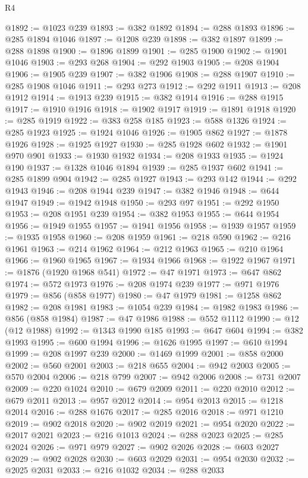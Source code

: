 \begin{lexlean}{R4}
\begin{coremodule}
@1892 := @1023 @239
@1893 := @382 @1892
@1894 := @288 @1893
@1896 := @285 @1894 @1046
@1897 := @1208 @239
@1898 := @382 @1897
@1899 := @288 @1898
@1900 := @1896 @1899
@1901 := @285 @1900
@1902 := @1901 @1046
@1903 := @293 @268
@1904 := @292 @1903
@1905 := @208 @1904
@1906 := @1905 @239
@1907 := @382 @1906
@1908 := @288 @1907
@1910 := @285 @1908 @1046
@1911 := @293 @273
@1912 := @292 @1911
@1913 := @208 @1912
@1914 := @1913 @239
@1915 := @382 @1914
@1916 := @288 @1915
@1917 := @1910 @1916
@1918 := @1902 @1917
@1919 := @1891 @1918
@1920 := @285 @1919
@1922 := @383 @258 @185
@1923 := @588 @1326
@1924 := @285 @1923
@1925 := @1924 @1046
@1926 := @1905 @862
@1927 := @1878 @1926
@1928 := @1925 @1927
@1930 := @285 @1928 @602
@1932 := @1901 @970 @901
@1933 := @1930 @1932
@1934 := @208 @1933
@1935 := @1924 @190
@1937 := @1328 @1046 @1894
@1939 := @285 @1937 @602
@1941 := @285 @1899 @904
@1942 := @285 @1927
@1943 := @293 @142
@1944 := @292 @1943
@1946 := @208 @1944 @239
@1947 := @382 @1946
@1948 := @644 @1947
@1949 := @1942 @1948
@1950 := @293 @97
@1951 := @292 @1950
@1953 := @208 @1951 @239
@1954 := @382 @1953
@1955 := @644 @1954
@1956 := @1949 @1955
@1957 := @1941 @1956
@1958 := @1939 @1957
@1959 := @1935 @1958
@1960 := @208 @1959
@1961 := @218 @590
@1962 := @216 @1961
@1963 := @214 @1962
@1964 := @212 @1963
@1965 := @210 @1964
@1966 := @1960 @1965
@1967 := @1934 @1966
@1968 := @1922 @1967
@1971 := @1876 (@1920 @1968 @541)
@1972 := @47 @1971
@1973 := @647 @862
@1974 := @572 @1973
@1976 := @208 @1974 @239
@1977 := @971 @1976
@1979 := @856 (@858 @1977)
@1980 := @47 @1979
@1981 := @1258 @862
@1982 := @208 @1981
@1983 := @1054 @239
@1984 := @1982 @1983
@1986 := @856 (@858 @1984)
@1987 := @47 @1986
@1988 := @552 @1112
@1990 := @12 (@12 @1988)
@1992 := @1343 @1990 @185
@1993 := @647 @604
@1994 := @382 @1993
@1995 := @600 @1994
@1996 := @1626 @1995
@1997 := @610 @1994
@1999 := @208 @1997 @239
@2000 := @1469 @1999
@2001 := @858 @2000
@2002 := @560 @2001
@2003 := @218 @655
@2004 := @942 @2003
@2005 := @570 @2004
@2006 := @218 @799
@2007 := @942 @2006
@2008 := @731 @2007
@2009 := @220 @1024
@2010 := @679 @2009
@2011 := @220 @2010
@2012 := @679 @2011
@2013 := @957 @2012
@2014 := @954 @2013
@2015 := @1218 @2014
@2016 := @288 @1676
@2017 := @285 @2016
@2018 := @971 @1210
@2019 := @902 @2018
@2020 := @902 @2019
@2021 := @954 @2020
@2022 := @2017 @2021
@2023 := @216 @1013
@2024 := @288 @2023
@2025 := @285 @2024
@2026 := @971 @979
@2027 := @902 @2026
@2028 := @603 @2027
@2029 := @902 @2028
@2030 := @603 @2029
@2031 := @954 @2030
@2032 := @2025 @2031
@2033 := @216 @1032
@2034 := @288 @2033

\end{coremodule}
\end{lexlean}
